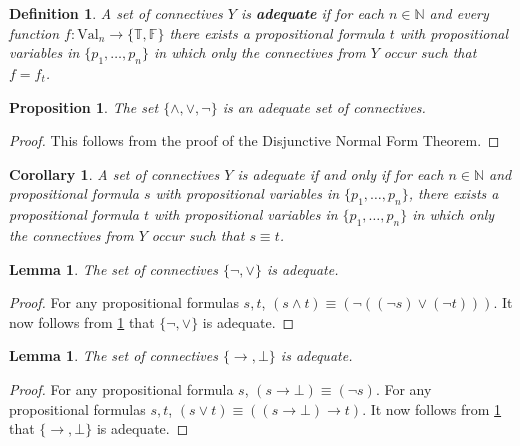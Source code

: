 \documentclass[11pt]{article}
\newtheorem{proposition}[theorem]{Proposition}
\newtheorem{cor}[theorem]{Corollary}
\newtheorem{definition}[theorem]{Definition}
\newtheorem{lemma}[theorem]{Lemma}
\newcommand{\N}{\mathbb{N}}
\newcommand{\F}{\mathbb{F}}
\newcommand{\T}{\mathbb{T}}
\begin{document}
\begin{definition}
A set of connectives $Y$ is \textbf{adequate} if for each $n\in\N$ and every function $f:\textrm{Val}_n\rightarrow \{\T,\F\}$ there exists a propositional formula $t$ with propositional variables in $\{p_1,\ldots,p_n\}$ in which only the connectives from $Y$ occur such that $f=f_t$.
\end{definition}



\begin{proposition}\label{DNFadequate}
The set $\{\wedge, \vee, \neg\}$ is an adequate set of connectives.
\end{proposition}
\begin{proof}
This follows from the proof of the Disjunctive Normal Form Theorem.
\end{proof}

\begin{cor}
A set of connectives $Y$ is adequate if and only if for each $n\in\N$ and propositional formula $s$ with propositional variables in $\{p_1,\ldots,p_n\}$, there exists a propositional formula $t$ with propositional variables in $\{p_1,\ldots,p_n\}$ in which only the connectives from $Y$ occur such that $s\equiv t$.
\end{cor}

\begin{lemma}\label{negoradequate}
The set of connectives $\{\neg, \vee\}$ is adequate.
\end{lemma}
\begin{proof}
For any propositional formulas $s,t$, $(s\wedge t)\equiv (\neg((\neg s)\vee(\neg t)))$. It now follows from \ref{DNFadequate} that $\{\neg, \vee\}$ is adequate.
\end{proof}

\begin{lemma}
The set of connectives $\{\rightarrow,\bot\}$ is adequate.
\end{lemma}
\begin{proof}
For any propositional formula $s$, $(s\rightarrow \bot)\equiv (\neg s)$. For any propositional formulas $s,t$, $(s\vee t)\equiv ((s\rightarrow \bot)\rightarrow t)$. It now follows from \ref{negoradequate} that $\{\rightarrow, \bot\}$ is adequate.
\end{proof}
\end{document}
